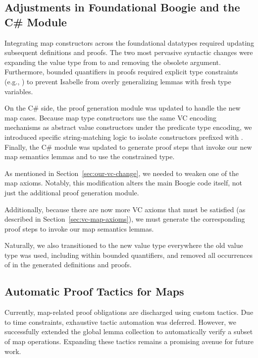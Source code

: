 \subsection{Adjustments in Foundational Boogie and the C\# Module}
\label{sec:adjust-foundational}

Integrating map constructors across the foundational datatypes required updating subsequent definitions and proofs.
The two most pervasive syntactic changes were expanding the value type from  to 
and removing the obsolete  argument.
Furthermore, bounded quantifiers in proofs required explicit type constraints (e.g., )
to prevent Isabelle from overly generalizing lemmas with fresh type variables.

On the C\# side, the proof generation module was updated to handle the new map cases.
Because map type constructors use the same VC encoding mechanisms as abstract value constructors under the predicate type encoding,
we introduced specific string-matching logic to isolate constructors prefixed with .
Finally, the C\# module was updated to generate proof steps that invoke our new map semantics lemmas
and to use the constrained  type.

As mentioned in Section~\ref{sec:our-vc-change}, we needed to weaken one of the map axioms.
Notably, this modification alters the main Boogie code itself, not just the additional proof generation module.

Additionally, because there are now more VC axioms that must be satisfied
(as described in Section~\ref{sec:vc-map-axioms}),
we must generate the corresponding proof steps to invoke our map semantics lemmas.

Naturally, we also transitioned to the new value type 
everywhere the old value type was used, including within bounded quantifiers,
and removed all occurrences of  in the generated definitions and proofs.


\subsection{Automatic Proof Tactics for Maps}
\label{sec:proof-tactics-map}

Currently, map-related proof obligations are discharged using custom  tactics.
Due to time constraints, exhaustive tactic automation was deferred.
However, we successfully extended the global lemma collection to automatically verify a subset of map operations.
Expanding these  tactics remains a promising avenue for future work.

